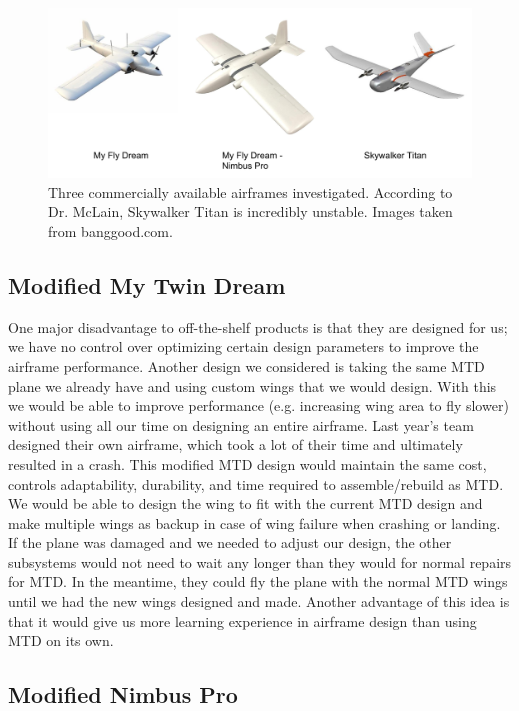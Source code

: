 \documentclass[]{auvsi_doc}
\begin{document}
\begin{figure}[h!]
	\centering
	\includegraphics[scale=0.5]{Planes1}
	\caption{Three commercially available airframes investigated. According to Dr. McLain, Skywalker Titan is incredibly unstable. Images taken from banggood.com.}
	\label{planes1}	
\end{figure}

\subsection{Modified My Twin Dream}

One major disadvantage to off-the-shelf products is that they are designed for us; we have no control over optimizing certain design parameters to improve the airframe performance. Another design we considered is taking the same MTD plane we already have and using custom wings that we would design. With this we would be able to improve performance (e.g. increasing wing area to fly slower) without using all our time on designing an entire airframe. Last year's team designed their own airframe, which took a lot of their time and ultimately resulted in a crash. This modified MTD design would maintain the same cost, controls adaptability, durability, and time required to assemble/rebuild as MTD. We would be able to design the wing to fit with the current MTD design and make multiple wings as backup in case of wing failure when crashing or landing. If the plane was damaged and we needed to adjust our design, the other subsystems would not need to wait any longer than they would for normal repairs for MTD. In the meantime, they could fly the plane with the normal MTD wings until we had the new wings designed and made. Another advantage of this idea is that it would give us more learning experience in airframe design than using MTD on its own.

\subsection{Modified Nimbus Pro}
\end{document}
